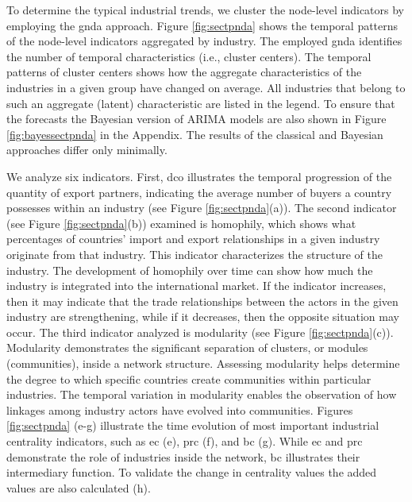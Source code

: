 \documentclass[preprint, 3p,
authoryear]{elsarticle} %
\begin{document}
To determine the typical industrial trends, we cluster the node-level
indicators by employing the \gls{gnda} approach. Figure
\ref{fig:sectpnda} shows the temporal patterns of the node-level
indicators aggregated by industry. The employed \gls{gnda} identifies
the number of temporal characteristics (i.e., cluster centers). The
temporal patterns of cluster centers shows how the aggregate
characteristics of the industries in a given group have changed on
average. All industries that belong to such an aggregate (latent)
characteristic are listed in the legend. To ensure that the forecasts
the Bayesian version of ARIMA models are also shown in Figure
\ref{fig:bayessectpnda} in the Appendix. The results of the classical
and Bayesian approaches differ only minimally.

We analyze six indicators. First, \gls{dco} illustrates the temporal
progression of the quantity of export partners, indicating the average
number of buyers a country possesses within an industry (see Figure
\ref{fig:sectpnda}(a)). The second indicator (see Figure
\ref{fig:sectpnda}(b)) examined is homophily, which shows what
percentages of countries' import and export relationships in a given
industry originate from that industry. This indicator characterizes the
structure of the industry. The development of homophily over time can
show how much the industry is integrated into the international market.
If the indicator increases, then it may indicate that the trade
relationships between the actors in the given industry are
strengthening, while if it decreases, then the opposite situation may
occur. The third indicator analyzed is modularity (see Figure
\ref{fig:sectpnda}(c)). Modularity demonstrates the significant
separation of clusters, or modules (communities), inside a network
structure. Assessing modularity helps determine the degree to which
specific countries create communities within particular industries. The
temporal variation in modularity enables the observation of how linkages
among industry actors have evolved into communities. Figures
\ref{fig:sectpnda} (e-g) illustrate the time evolution of most important
industrial centrality indicators, such as \gls{ec} (e), \gls{prc} (f),
and \gls{bc} (g). While \gls{ec} and \gls{prc} demonstrate the role of
industries inside the network, \gls{bc} illustrates their intermediary
function. To validate the change in centrality values the added values
are also calculated (h).
\end{document}
